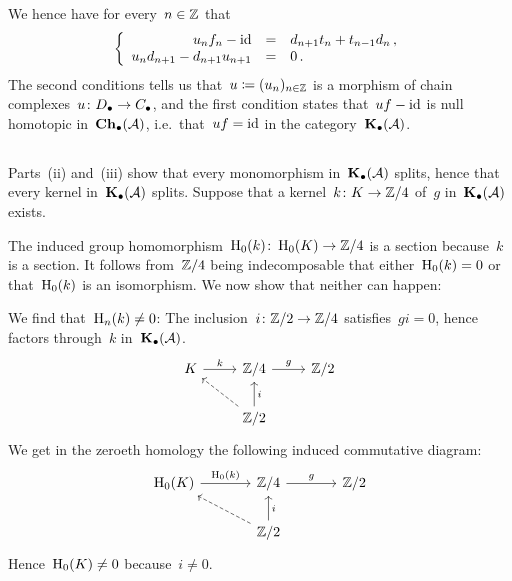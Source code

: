 We hence have for every~$n \in \mathbb{Z}$ that
\[
  \left\{
    \begin{array}{rcl}
        u_n f_n - \operatorname{id}                 &=& d_{n+1} t_n + t_{n-1} d_n \,, \\
        u_n d_{n+1} - d_{n+1} u_{n+1} &=& 0 \,.
    \end{array}
  \right.
\]
The second conditions tells us that~$u \coloneqq (u_n)_{n \in \mathbb{Z}}$ is a morphism of chain complexes~$u \colon D_\bullet \to C_\bullet$, and the first condition states that~$uf - \operatorname{id}$ is null homotopic in~$\mathbf{Ch}_\bullet(\mathcal{A})$, i.e.\ that~$uf = \operatorname{id}$ in the category~$\mathbf{K}_\bullet(\mathcal{A})$.





\subsection{}

Parts~(ii) and~(iii) show that every monomorphism in~$\mathbf{K}_\bullet(\mathcal{A})$ splits, hence that every kernel in~$\mathbf{K}_\bullet(\mathcal{A})$ splits.
Suppose that a kernel~$k \colon K \to \mathbb{Z}/4$ of~$g$ in~$\mathbf{K}_\bullet(\mathcal{A})$ exists.

The induced group homomorphism~$\operatorname{H}_0(k) \colon \operatorname{H}_0(K) \to \mathbb{Z}/4$ is a section because~$k$ is a section.
It follows from~$\mathbb{Z}/4$ being indecomposable that either~$\operatorname{H}_0(k) = 0$ or that~$\operatorname{H}_0(k)$ is an isomorphism.
We now show that neither can happen:

We find that~$\operatorname{H}_n(k) \neq 0$:
The inclusion~$i \colon \mathbb{Z}/2 \to \mathbb{Z}/4$ satisfies~$gi = 0$, hence factors through~$k$ in~$\mathbf{K}_\bullet(\mathcal{A})$.
\[
  \begin{tikzcd}
      K
      \arrow{r}[above]{k}
    & \Integer/4
      \arrow{r}[above]{g}
    & \Integer/2
    \\
      {}
    & \Integer/2
      \arrow[dashed]{ul}
      \arrow{u}[right]{i}
    & {}
  \end{tikzcd}
\]
We get in the zeroeth homology the following induced commutative diagram:
\[
  \begin{tikzcd}[column sep = large]
      \Hl_0(K)
      \arrow{r}[above]{\Hl_0(k)}
    & \Integer/4
      \arrow{r}[above]{g}
    & \Integer/2
    \\
      {}
    & \Integer/2
      \arrow[dashed]{ul}
      \arrow{u}[right]{i}
    & {}
  \end{tikzcd}
\]
Hence~$\operatorname{H}_0(K) \neq 0$ because~$i \neq 0$.


